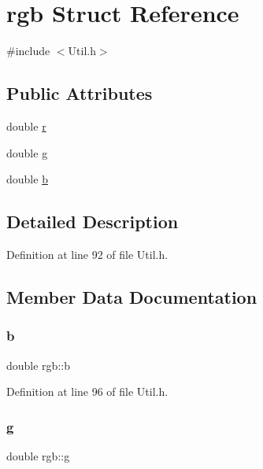 \hypertarget{structrgb}{}\section{rgb Struct Reference}
\label{structrgb}


{\ttfamily \#include $<$Util.\+h$>$}

\subsection*{Public Attributes}
\begin{DoxyCompactItemize}
\item 
double \mbox{\hyperlink{structrgb_ad5a38e43f70fb57d6da052745ea5ff90}{r}}
\item 
double \mbox{\hyperlink{structrgb_a1c51cad47a05c797643776f9357a8749}{g}}
\item 
double \mbox{\hyperlink{structrgb_aa3e45a2c26ad435fe29dfea49f16831e}{b}}
\end{DoxyCompactItemize}


\subsection{Detailed Description}


Definition at line 92 of file Util.\+h.



\subsection{Member Data Documentation}
\mbox{\label{structrgb_aa3e45a2c26ad435fe29dfea49f16831e}} 
\subsubsection{\texorpdfstring{b}{b}}
{\footnotesize\ttfamily double rgb\+::b}



Definition at line 96 of file Util.\+h.

\mbox{\label{structrgb_a1c51cad47a05c797643776f9357a8749}} 
\subsubsection{\texorpdfstring{g}{g}}
{\footnotesize\ttfamily double rgb\+::g}



